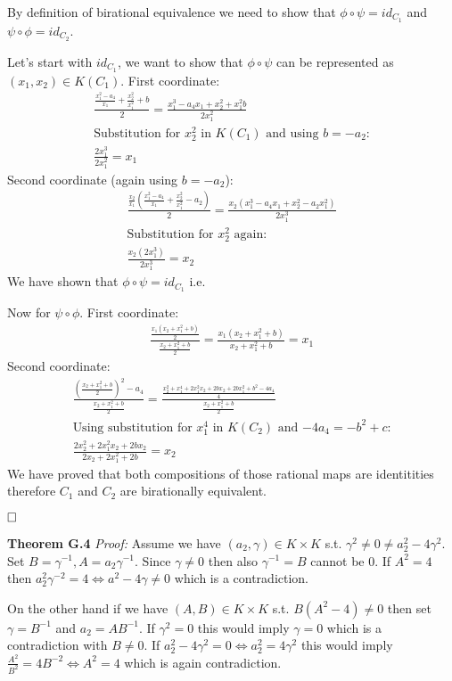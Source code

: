 \documentclass[12pt, a4paper]{article}
\newcommand{\qed}{\hfill\square}
\begin{document}
By definition of birational equivalence we need to show that $\phi \circ \psi = id_{C_1}$ and $\psi \circ \phi = id_{C_2}$.

Let's start with $id_{C_1}$, we want to show that $\phi \circ \psi$ can be represented as $(x_1, x_2) \in K(C_1)$. First coordinate:
\begin{gather*}
\frac{\frac{x_1^2-a_4}{x_1}+\frac{x_2^2}{x_1^2}+b}{2} = \frac{x_1^3-a_4x_1+x_2^2+x_1^2b}{2x_1^2}\\
\text{Substitution for $x_2^2$ in $K(C_1)$ and using $b=-a_2$:}\\
\frac{2x_1^3}{2x_1^2} = x_1
\end{gather*}
Second coordinate (again using $b=-a_2$):
\begin{gather*}
\frac{\frac{x_2}{x_1}\left(\frac{x_1^2-a_4}{x_1} + \frac{x_2^2}{x_1^2} - a_2 \right)}{2} = \frac{x_2(x_1^3-a_4x_1+x_2^2-a_2x_1^2)}{2x_1^3}\\
\text{Substitution for $x_2^2$ again:}\\
\frac{x_2(2x_1^3)}{2x_1^3} = x_2
\end{gather*}
We have shown that $\phi \circ \psi = id_{C_1}$ i.e. 

Now for $\psi \circ \phi$. First coordinate:
\begin{gather*}
\frac{\frac{x_1(x_2+x_1^2+b)}{2}}{\frac{x_2+x_1^2+b}{2}} = \frac{x_1(x_2+x_1^2+b)}{x_2+x_1^2+b} = x_1
\end{gather*}
Second coordinate:
\begin{gather*}
\frac{\left(\frac{x_2+x_1^2+b}{2}\right)^2 - a_4}{\frac{x_2+x_1^2+b}{2}} = \frac{\frac{x_2^2+x_1^4+2x_1^2x_2+2bx_2+2bx_1^2+b^2-4a_4}{4}}{\frac{x_2+x_1^2+b}{2}}\\
\text{Using substitution for $x_1^4$ in $K(C_2)$ and $-4a_4 = -b^2+c$:}\\
\frac{2x_2^2+2x_1^2x_2+2bx_2}{2x_2+2x_1^2+2b} = x_2
\end{gather*}
We have proved that both compositions of those rational maps are identitities therefore $C_1$ and $C_2$ are birationally equivalent.

$\qed$

\textbf{Theorem G.4} \textit{Proof:}
Assume we have $(a_2, \gamma) \in K \times K$ s.t. $\gamma^2 \neq 0 \neq a_2^2-4\gamma^2$. Set $B = \gamma^{-1}, A = a_2\gamma^{-1}$. Since $\gamma \neq 0$ then also $\gamma^{-1} = B$ cannot be 
0. If $A^2 = 4$ then $a_2^2\gamma^{-2} = 4 \iff a^2 - 4\gamma \neq 0$ which is a contradiction.

On the other hand if we have $(A,B) \in K \times K$ s.t. $B(A^2-4)\neq 0$ then set $\gamma = B^{-1}$ and $a_2 = AB^{-1}$. If $\gamma^2 = 0$ this would imply $\gamma = 0$ which is a contradiction with $B \neq 0$. If $a_2^2-4\gamma^2 =0 \iff a_2^2 = 4\gamma^2$ this would imply $\frac{A^2}{B^2} = 4B^{-2} \iff A^2 = 4$ which is again contradiction.
\end{document}
